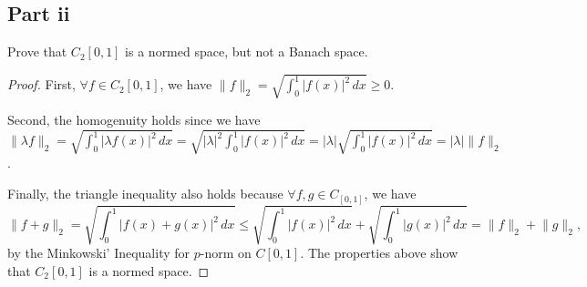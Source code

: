 \subsection{Part ii}

\begin{question}
    Prove that $C_2[0,1]$ is a normed space, but not a Banach space.
\end{question}

\begin{answer}
    \begin{proof}
        First, $\forall f \in C_2[0,1]$, we have $\lVert f \rVert_2 = \sqrt{\int_0^1{\lvert f(x) \rvert^2}\,dx} \geq 0$.
        
        Second, the homogenuity holds since we have $\lVert \lambda f \rVert_2 = \sqrt{\int_0^1{\lvert \lambda f(x) \rvert^2 \,dx}} = \sqrt{\lvert \lambda \rvert^2 \int_0^1 {\lvert f(x) \rvert^2}\,dx} = \lvert \lambda \rvert \sqrt{\int_0^1 {\lvert f(x) \rvert^2 \,dx}} = \lvert \lambda \rvert \lVert f \rVert_2$.
        
        Finally, the triangle inequality also holds because $\forall f, g \in C_[0,1]$, we have 
        \begin{equation}
            \lVert f + g \rVert_2 = \sqrt{\int_0^1{\lvert f(x) + g(x) \rvert^2} \,dx} \leq \sqrt{\int_0^1{\lvert f(x) \rvert^2}\,dx} + \sqrt{\int_0^1 \lvert g(x) \rvert^2 \,dx} = \lVert f \rVert_2 + \lVert g \rVert_2,
        \end{equation}
        by the Minkowski' Inequality for $p$-norm on $C[0,1]$. The properties above show that $C_2[0,1]$ is a normed space.
        

\end{proof}
\end{answer}
